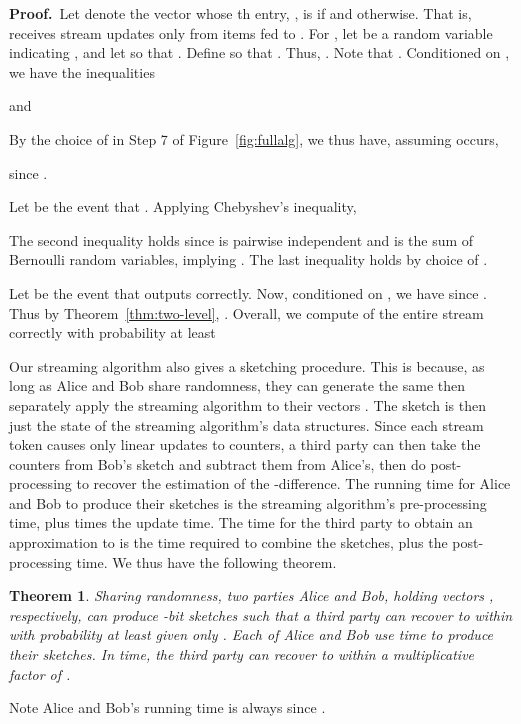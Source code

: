 \documentclass[letterpaper,11pt]{article}
\newcommand{\TheoremName}[1]{\label{thm:#1}}
\newcommand{\Theorem}[1]{Theorem~\ref{thm:#1}}
\newcommand{\Figure}[1]{Figure~\ref{fig:#1}}
\newtheorem{theorem}{Theorem}\newtheorem{corollary}[theorem]{Corollary}
\newcommand{\proofbelow}{3pt}
\newcommand{\afterproof}{\hfill  \par \vspace{\proofbelow}}
\renewenvironment{proof}{\noindent\textbf{Proof.}\,}{\afterproof}
\begin{document}
\begin{proof}
Let  denote the vector whose th entry, , is 
if  and  otherwise.  That is,  receives
stream updates
only from items fed to . For , let  be a
random variable indicating , and let  so that . Define  so that . Thus, . 
Note that .  Conditioned on
, we have the inequalities

and

By
the choice of  in
Step 7 of \Figure{fullalg}, we thus have, assuming 
occurs,

since .

Let  be the event that .  Applying Chebyshev's inequality,

The second inequality holds since  is pairwise independent and 
is the sum of Bernoulli random variables, implying . The last inequality
holds by choice of .

Let  be the event that  outputs 
correctly. Now, conditioned on
, we have  since .  Thus by \Theorem{two-level},
. Overall,
we compute
 of the entire stream correctly with probability at least

\end{proof}

Our streaming algorithm also gives a sketching procedure. This is
because, as long as Alice and Bob share randomness, they can generate
the same  then separately apply the streaming
algorithm to their vectors . The sketch is then just the state of
the
streaming algorithm's data structures.  Since each stream token causes
only linear updates to counters, a third party
can then take the counters from Bob's sketch and subtract them from
Alice's, then do post-processing to recover the estimation of the
-difference. The running time for Alice and Bob to produce their
sketches is the streaming algorithm's pre-processing time, plus 
times the update time. The time for the third party to obtain an
approximation to  is the time required to combine the
sketches, plus the post-processing time.  We thus
have the following theorem.

\begin{theorem}\TheoremName{sketching}
Sharing  randomness, two parties Alice and Bob,
holding vectors , respectively, can produce
-bit sketches 
such that a third party can recover  to within 
with probability at
least  given only .  Each of Alice and Bob use
time  to produce their sketches. In
 time,
the third party can recover  to within a multiplicative
factor of . \afterproof
\end{theorem}

Note Alice and Bob's running time is
always  since .
\end{document}
